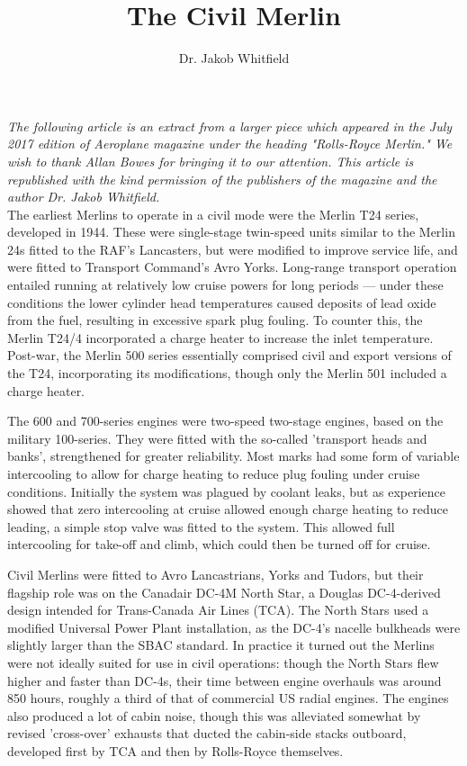 %


\title{The Civil Merlin} 
\author{Dr. Jakob Whitfield}
\maketitle

\textit{The following article is an extract from a larger piece which appeared
in the July 2017 edition of Aeroplane magazine under the heading
"Rolls-Royce Merlin."  We wish to thank Allan Bowes for bringing it to
our attention. This article is republished with the kind permission of
the publishers of the magazine and the author Dr. Jakob Whitfield.}\\


The earliest Merlins to operate in a civil mode were the Merlin T24 series,
developed in 1944. These were single-stage twin-speed units similar to the
Merlin 24s fitted to the RAF's Lancasters, but were modified to improve service
life, and were fitted to Transport Command's Avro Yorks. Long-range transport
operation entailed running at relatively low cruise powers for long periods —
under these conditions the lower cylinder head temperatures caused deposits of
lead oxide from the fuel, resulting in excessive spark plug fouling. To counter
this, the Merlin T24/4 incorporated a charge heater to increase the inlet
temperature. Post-war, the Merlin 500 series essentially comprised civil and
export versions of the T24, incorporating its modifications, though only the
Merlin 501 included a charge heater.

The 600 and 700-series engines were two-speed two-stage engines, based on the
military 100-series. They were fitted with the so-called 'transport heads and
banks', strengthened for greater reliability. Most marks had some form of
variable intercooling to allow for charge heating to reduce plug fouling under
cruise conditions. Initially the system was plagued by coolant leaks, but as
experience showed that zero intercooling at cruise allowed enough charge
heating to reduce leading, a simple stop valve was fitted to the system. This
allowed full intercooling for take-off and climb, which could then be turned
off for cruise. 

Civil Merlins were fitted to Avro Lancastrians, Yorks and Tudors, but their
flagship role was on the Canadair DC-4M North Star, a Douglas DC-4-derived
design intended for Trans-Canada Air Lines (TCA). The North Stars used a
modified Universal Power Plant installation, as the DC-4's nacelle bulkheads
were slightly larger than the SBAC standard. In practice it turned out the
Merlins were not ideally suited for use in civil operations: though the North
Stars flew higher and faster than DC-4s, their time between engine overhauls
was around 850 hours, roughly a third of that of commercial US radial engines.
The engines also produced a lot of cabin noise, though this was alleviated
somewhat by revised 'cross-over' exhausts that ducted the cabin-side stacks
outboard, developed first by TCA and then by Rolls-Royce themselves.

